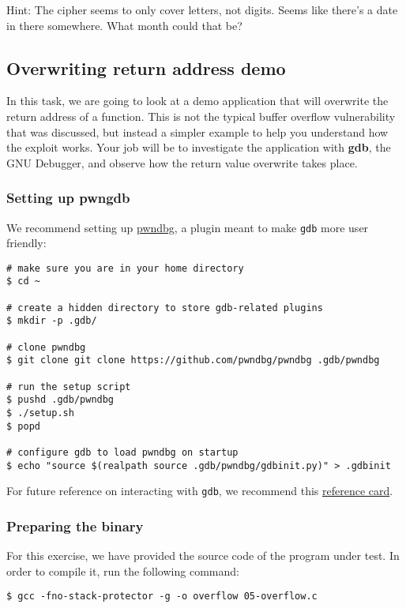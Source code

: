 Hint: The cipher seems to only cover letters, not digits. Seems like there's a
      date in there somewhere. What month could that be?

\subsection{Overwriting return address demo}

In this task, we are going to look at a demo application that will overwrite
the return address of a function. This is not the typical buffer overflow
vulnerability that was discussed, but instead a simpler example to help you
understand how the exploit works. Your job will be to investigate the
application with \textbf{gdb}, the GNU Debugger, and observe how the return
value overwrite takes place.

\subsubsection{Setting up pwngdb}

We recommend setting up
\href{https://github.com/pwndbg/pwndbg.git}{pwndbg}, a plugin meant to make
\texttt{gdb} more user friendly:

\begin{lstlisting}[style=bashstyle]
# make sure you are in your home directory
$ cd ~

# create a hidden directory to store gdb-related plugins
$ mkdir -p .gdb/

# clone pwndbg
$ git clone git clone https://github.com/pwndbg/pwndbg .gdb/pwndbg

# run the setup script
$ pushd .gdb/pwndbg
$ ./setup.sh
$ popd

# configure gdb to load pwndbg on startup
$ echo "source $(realpath source .gdb/pwndbg/gdbinit.py)" > .gdbinit
\end{lstlisting}

For future reference on interacting with \texttt{gdb}, we recommend this
\href{https://users.ece.utexas.edu/~adnan/gdb-refcard.pdf}{reference card}.

\subsubsection{Preparing the binary}

For this exercise, we have provided the source code of the program under test.
In order to compile it, run the following command:

\begin{lstlisting}[style=bashstyle]
$ gcc -fno-stack-protector -g -o overflow 05-overflow.c
\end{lstlisting}


